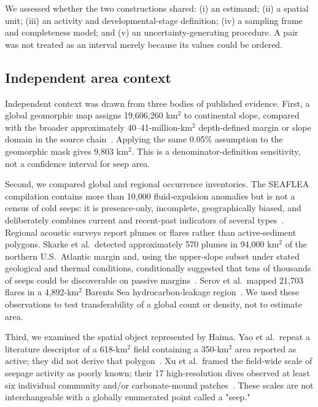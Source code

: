 \documentclass[11pt,letterpaper]{article}
\begin{document}
We assessed whether the two constructions shared: (i) an estimand; (ii) a spatial unit; (iii) an activity and developmental-stage definition; (iv) a sampling frame and completeness model; and (v) an uncertainty-generating procedure. A pair was not treated as an interval merely because its values could be ordered.

\subsection{Independent area context}

Independent context was drawn from three bodies of published evidence. First, a global geomorphic map assigns 19,606,260 km$^2$ to continental slope, compared with the broader approximately 40--41-million-km$^2$ depth-defined margin or slope domain in the source chain~\cite{harris2014,menot2010,boetius2013}. Applying the same 0.05\% assumption to the geomorphic mask gives 9,803 km$^2$. This is a denominator-definition sensitivity, not a confidence interval for seep area.

Second, we compared global and regional occurrence inventories. The SEAFLEA compilation contains more than 10,000 fluid-expulsion anomalies but is not a census of cold seeps: it is presence-only, incomplete, geographically biased, and deliberately combines current and recent-past indicators of several types~\cite{phrampus2020}. Regional acoustic surveys report plumes or flares rather than active-sediment polygons. Skarke et al.\ detected approximately 570 plumes in 94,000 km$^2$ of the northern U.S.\ Atlantic margin and, using the upper-slope subset under stated geological and thermal conditions, conditionally suggested that tens of thousands of seeps could be discoverable on passive margins~\cite{skarke2014}. Serov et al.\ mapped 21,703 flares in a 4,892-km$^2$ Barents Sea hydrocarbon-leakage region~\cite{serov2024}. We used these observations to test transferability of a global count or density, not to estimate area.

Third, we examined the spatial object represented by Haima. Yao et al.\ repeat a literature descriptor of a 618-km$^2$ field containing a 350-km$^2$ area reported as active; they did not derive that polygon~\cite{yao2022}. Xu et al.\ framed the field-wide scale of seepage activity as poorly known; their 17 high-resolution dives observed at least six individual community and/or carbonate-mound patches~\cite{xu2020}. These scales are not interchangeable with a globally enumerated point called a "seep."
\end{document}
